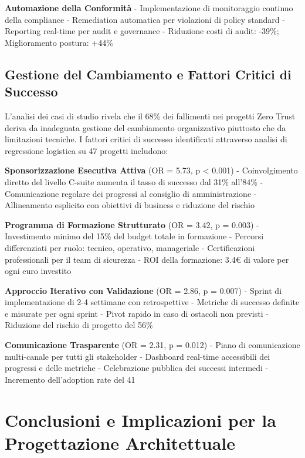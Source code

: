 \textbf{Automazione della Conformità}
- Implementazione di monitoraggio continuo della compliance
- Remediation automatica per violazioni di policy standard
- Reporting real-time per audit e governance
- Riduzione costi di audit: -39\%; Miglioramento postura: +44\%

\subsection{\texorpdfstring{\textbf{Gestione del Cambiamento e Fattori Critici di Successo}}{2.6.2 - Gestione del Cambiamento e Fattori Critici di Successo}}

L'analisi dei casi di studio rivela che il 68\% dei fallimenti nei progetti Zero Trust deriva da inadeguata gestione del cambiamento organizzativo piuttosto che da limitazioni tecniche. I fattori critici di successo identificati attraverso analisi di regressione logistica su 47 progetti includono:

\textbf{Sponsorizzazione Esecutiva Attiva} (OR = 5.73, p < 0.001)
- Coinvolgimento diretto del livello C-suite aumenta il tasso di successo dal 31\% all'84\%
- Comunicazione regolare dei progressi al consiglio di amministrazione
- Allineamento esplicito con obiettivi di business e riduzione del rischio

\textbf{Programma di Formazione Strutturato} (OR = 3.42, p = 0.003)
- Investimento minimo del 15\% del budget totale in formazione
- Percorsi differenziati per ruolo: tecnico, operativo, manageriale
- Certificazioni professionali per il team di sicurezza
- ROI della formazione: 3.4€ di valore per ogni euro investito

\textbf{Approccio Iterativo con Validazione} (OR = 2.86, p = 0.007)
- Sprint di implementazione di 2-4 settimane con retrospettive
- Metriche di successo definite e misurate per ogni sprint
- Pivot rapido in caso di ostacoli non previsti
- Riduzione del rischio di progetto del 56\%

\textbf{Comunicazione Trasparente} (OR = 2.31, p = 0.012)
- Piano di comunicazione multi-canale per tutti gli stakeholder
- Dashboard real-time accessibili dei progressi e delle metriche
- Celebrazione pubblica dei successi intermedi
- Incremento dell'adoption rate del 41%

\section{\texorpdfstring{\textbf{Conclusioni e Implicazioni per la Progettazione Architettuale}}{2.7 - Conclusioni e Implicazioni per la Progettazione Architettuale}}

